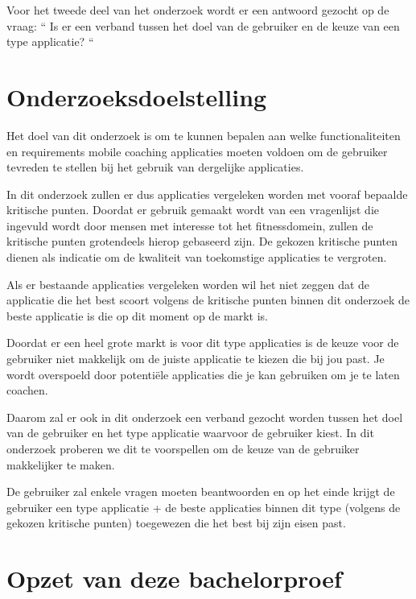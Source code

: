 Voor het tweede deel van het onderzoek wordt er een antwoord gezocht op de vraag: “ Is er een verband tussen het doel van de gebruiker en de keuze van een type applicatie? “

\section{Onderzoeksdoelstelling}
\label{sec:onderzoeksdoelstelling}

Het doel van dit onderzoek is om te kunnen bepalen aan welke functionaliteiten en requirements mobile coaching applicaties moeten voldoen om de gebruiker tevreden te stellen bij het gebruik van dergelijke applicaties. 

In dit onderzoek zullen er dus applicaties vergeleken worden met vooraf bepaalde kritische punten. Doordat er gebruik gemaakt wordt van een vragenlijst die ingevuld wordt door mensen met interesse tot het fitnessdomein, zullen de kritische punten grotendeels hierop gebaseerd zijn. De gekozen kritische punten dienen als indicatie om de kwaliteit van toekomstige applicaties te vergroten.  

Als er bestaande applicaties vergeleken worden wil het niet zeggen dat de applicatie die het best scoort volgens de kritische punten binnen dit onderzoek de beste applicatie is die op dit moment op de markt is. 

Doordat er een heel grote markt is voor dit type applicaties is de keuze voor de gebruiker niet makkelijk om de juiste applicatie te kiezen die bij jou past. Je wordt overspoeld door potentiële applicaties die je kan gebruiken om je te laten coachen.

Daarom zal er ook in dit onderzoek een verband gezocht worden tussen het doel van de gebruiker en het type applicatie waarvoor de gebruiker kiest. In dit onderzoek proberen we dit te voorspellen om de keuze van de gebruiker makkelijker te maken. 

De gebruiker zal enkele vragen moeten beantwoorden en op het einde krijgt de gebruiker een type applicatie + de beste applicaties binnen dit type (volgens de gekozen kritische punten) toegewezen die het best bij zijn eisen past.

\newpage
\section{Opzet van deze bachelorproef}
\label{sec:opzet-bachelorproef}


